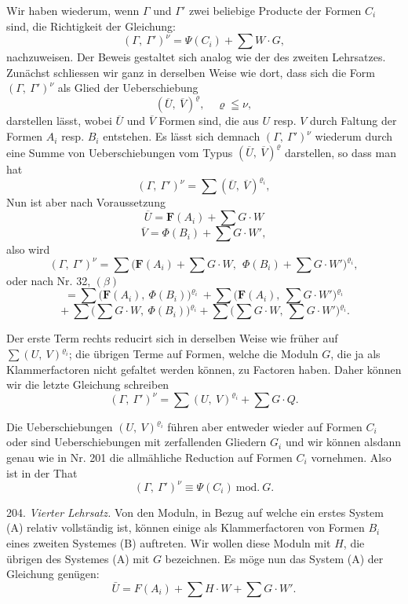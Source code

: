 \documentclass[11pt]{article}
\providecommand{\weberpage}[1]{}
\providecommand{\weq}[2]{\begin{equation}\tag{#1}#2\end{equation}}
\let\Gamma\varGamma
\let\Phi\varPhi
\let\Psi\varPsi
\begin{document}
Wir haben wiederum, wenn $\Gamma$ und $\Gamma'$ zwei beliebige
Producte der Formen $C_i$ sind, die Richtigkeit der Gleichung:
\[ (\Gamma,\ \Gamma')^\nu = \boldsymbol{\Psi}(C_i) + \sum W\cdot G, \]
nachzuweisen. Der Beweis gestaltet sich analog wie der des zweiten
Lehrsatzes. Zunächst schliessen wir ganz in derselben Weise wie
dort, dass sich die Form $(\Gamma,\ \Gamma')^\nu$ als Glied der
Ueberschiebung
\[ (\overline U,\ \overline V)^\varrho,\quad \varrho \leqq \nu, \]
darstellen lässt, wobei $\overline U$ und $\overline V$ Formen sind, die
aus $U$ resp. $V$ durch Faltung der Formen $A_i$ resp. $B_i$
entstehen. Es lässt sich demnach $(\Gamma,\ \Gamma')^\nu$ wiederum
durch eine Summe von Ueberschiebungen vom Typus $(\overline U,\ \overline V)^\varrho$
darstellen, so dass man hat
\[ (\Gamma,\ \Gamma')^\nu = \sum (\overline U,\ \overline V)^{\varrho_i}, \]
Nun ist aber nach Voraussetzung
\[ \overline U = \boldsymbol{F}(A_i) + \sum G\cdot W \]
\[ \overline V = \boldsymbol{\Phi}(B_i) + \sum G\cdot W', \]
also wird
\[ (\Gamma,\ \Gamma')^\nu = \sum \big(\boldsymbol{F}(A_i) + \sum G\cdot W,\ \ \boldsymbol{\Phi}(B_i)+\sum G\cdot W'\big)^{\varrho_i}, \]
oder nach Nr. 32, $(\beta)$
\[ = \sum \big(\boldsymbol{F}(A_i),\ \boldsymbol{\Phi}(B_i)\big)^{\varrho_i} \ + \sum \big(\boldsymbol{F}(A_i),\ \sum G\cdot W'\big)^{\varrho_i} \]
\[ {}+ \sum \big(\sum G\cdot W,\ \boldsymbol{\Phi}(B_i)\big)^{\varrho_i} + \sum \big(\sum G\cdot W,\ \sum G\cdot W'\big)^{\varrho_i}. \]

Der erste Term rechts reducirt sich in derselben Weise wie früher
auf $\sum (U,\ V)^{\varrho_i}$; die übrigen Terme auf Formen, welche die
Moduln $G$, die ja als Klammerfactoren nicht gefaltet werden können,
zu Factoren haben. Daher können wir die letzte Gleichung schreiben
\[ (\Gamma,\ \Gamma')^\nu = \sum (U,\ V)^{\varrho_i} + \sum G\cdot Q. \]

Die Ueberschiebungen $(U,\ V)^{\varrho_i}$ führen aber entweder wieder
auf Formen $C_i$ oder sind Ueberschiebungen mit zerfallenden
Gliedern $G_i$ und wir können alsdann genau wie in Nr. 201 die
allmähliche Reduction auf Formen $C_i$ vornehmen. Also ist in der
That
\[ (\Gamma,\ \Gamma')^\nu \equiv \boldsymbol{\Psi}(C_i)\ \mathrm{mod.}\ G. \]


\weberpage{229}
204. \textit{Vierter Lehrsatz.} Von den Moduln, in Bezug auf welche ein
erstes System (A) relativ vollständig ist, können einige als Klammerfactoren
von Formen $B_i$ eines zweiten Systemes (B) auftreten. Wir wollen diese
Moduln mit $H$, die übrigen des Systemes (A) mit $G$ bezeichnen. Es möge
nun das System (A) der Gleichung genügen:
\weq{1}{\bar U = F(A_i) + \sum H\cdot W + \sum G\cdot W'.}
\end{document}
